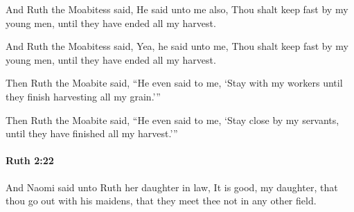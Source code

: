 			And Ruth the Moabitess said, He said unto me also, Thou shalt keep fast by my young men, until they have ended all my harvest.

			\begin{versebox}
					\item[BHS] 
					\item[LXX] 
					\item[ASV] And Ruth the Moabitess said, Yea, he said unto me, Thou shalt keep fast by my young men, until they have ended all my harvest.
					\item[NIV] Then Ruth the Moabite said, “He even said to me, ‘Stay with my workers until they finish harvesting all my grain.’”
					\item[NRSV] Then Ruth the Moabite said, “He even said to me, ‘Stay close by my servants, until they have finished all my harvest.’”
			\end{versebox}

		\paragraph{Ruth 2:22} %
			\label{RUTH-2-22}

			And Naomi said unto Ruth her daughter in law, It is good, my daughter, that thou go out with his maidens, that they meet thee not in any other field.

